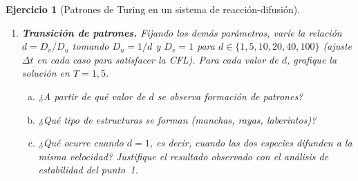 \documentclass[12pt]{article}
\newtheorem{exercise}{Ejercicio}
\def\dt{\Delta t}
\begin{document}
\begin{exercise}[Patrones de Turing en un sistema de reacción-difusión]
\begin{enumerate}
\item \textbf{Transición de patrones.} Fijando los demás parámetros, varíe la relación $d = D_v / D_u$ tomando $D_u = 1/d$ y $D_v = 1$ para $d \in \{1, 5, 10, 20, 40, 100\}$ (ajuste $\dt$ en cada caso para satisfacer la CFL). Para cada valor de $d$, grafique la solución en $T = 1{,}5$.
\begin{enumerate}[(a)]
\item ¿A partir de qué valor de $d$ se observa formación de patrones?
\item ¿Qué tipo de estructuras se forman (manchas, rayas, laberintos)?
\item ¿Qué ocurre cuando $d = 1$, es decir, cuando las dos especies difunden a la misma velocidad? Justifique el resultado observado con el análisis de estabilidad del punto~1.
\end{enumerate}

\end{enumerate}
\end{exercise}
\end{document}

